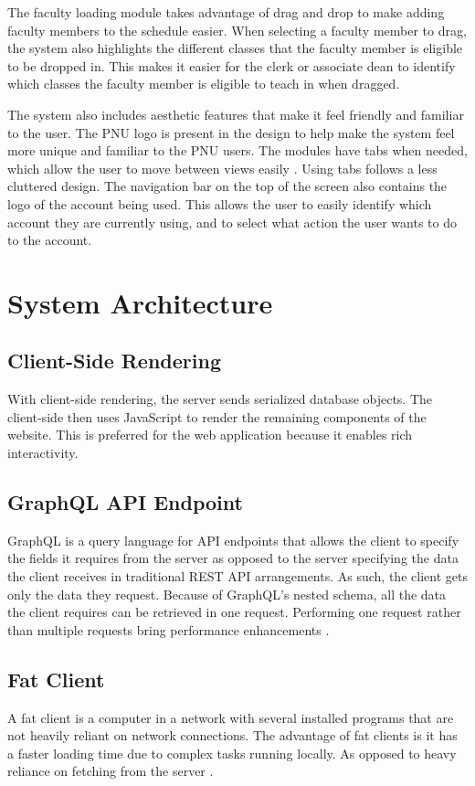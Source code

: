 The faculty loading module takes advantage of drag and drop to make adding faculty members to the schedule easier. When selecting a faculty member to drag, the system also highlights the different classes that the faculty member is eligible to be dropped in. This makes it easier for the clerk or associate dean to identify which classes the faculty member is eligible to teach in when dragged.

The system also includes aesthetic features that make it feel friendly and familiar to the user. The PNU logo is present in the design to help make the system feel more unique and familiar to the PNU users. The modules have tabs when needed, which allow the user to move between views easily \cite{ref:Tabs}. Using tabs follows a less cluttered design. The navigation bar on the top of the screen also contains the logo of the account being used. This allows the user to easily identify which account they are currently using, and to select what action the user wants to do to the account.

\section{System Architecture}

\subsection{Client-Side Rendering}
With client-side rendering, the server sends serialized database objects. The client-side then uses JavaScript to render the remaining components of the website. This is preferred for the web application because it enables rich interactivity. \cite{ref:ClientSide}

\subsection{GraphQL API Endpoint}
GraphQL is a query language for API endpoints that allows the client to specify the fields it requires from the server as opposed to the server specifying the data the client receives in traditional REST API arrangements. As such, the client gets only the data they request. Because of GraphQL's nested schema, all the data the client requires can be retrieved in one request. Performing one request rather than multiple requests bring performance enhancements \cite{ref:GraphQL}.

\subsection{Fat Client}
A fat client is a computer in a network with several installed programs that are not heavily reliant on network connections. The advantage of fat clients is it has a faster loading time due to complex tasks running locally. As opposed to heavy reliance on fetching from the server \cite{ref:FatClient}.

